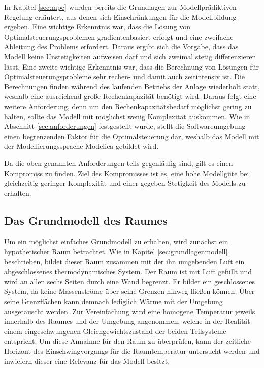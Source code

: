 In Kapitel \ref{sec:mpc} wurden bereits die Grundlagen zur Modellprädiktiven Regelung erläutert, aus denen sich Einschränkungen für die Modellbildung ergeben. Eine wichtige Erkenntnis war, dass die Lösung von Optimalsteuerungsproblemen gradientenbasiert erfolgt und eine zweifache Ableitung des Problems erfordert. Daraus ergibt sich die Vorgabe, dass das Modell keine Unstetigkeiten aufweisen darf und sich zweimal stetig differenzieren lässt.
Eine zweite wichtige Erkenntnis war, dass die Berechnung von Lösungen für Optimalsteuerungsprobleme sehr rechen- und damit auch zeitintensiv ist. Die Berechnungen finden während des laufenden Betriebs der Anlage wiederholt statt, weshalb eine ausreichend große Rechenkapazität benötigt wird. Daraus folgt eine weitere Anforderung, denn um den Rechenkapazitätsbedarf möglichst gering zu halten, sollte das Modell mit  möglichst wenig Komplexität auskommen.
Wie in Abschnitt \ref{sec:anforderungen} festgestellt wurde, stellt die Softwareumgebung einen begrenzenden Faktor für die Optimalsteuerung dar, weshalb das Modell mit der Modellierungssprache Modelica gebildet wird.

Da die oben genannten Anforderungen teils gegenläufig sind, gilt es einen Kompromiss zu finden. Ziel des Kompromisses ist es, eine hohe Modellgüte bei gleichzeitig geringer Komplexität und einer gegeben Stetigkeit des Modells zu erhalten. 

\subsection{Das Grundmodell des Raumes}

Um ein möglichst einfaches Grundmodell zu erhalten, wird zunächst ein hypothetischer Raum betrachtet. Wie in Kapitel \ref{sec:grundlagenmodell} beschrieben, bildet dieser Raum zusammen mit der ihn umgebenden Luft ein abgeschlossenes thermodynamisches System. Der Raum ist mit Luft gefüllt und wird an allen sechs Seiten durch eine Wand begrenzt. Er bildet ein geschlossenes System, da keine Massenströme über seine Grenzen hinweg fließen können. Über seine Grenzflächen kann demnach lediglich Wärme mit der Umgebung ausgetauscht werden. Zur Vereinfachung wird eine homogene Temperatur jeweils innerhalb des Raumes und der Umgebung angenommen, welche in der Realität einem eingeschwungenen Gleichgewichtszustand der beiden Teilsysteme entspricht. Um diese Annahme für den Raum zu überprüfen, kann der zeitliche Horizont des Einschwingvorgangs für die Raumtemperatur untersucht werden und inwiefern dieser eine Relevanz für das Modell besitzt.

